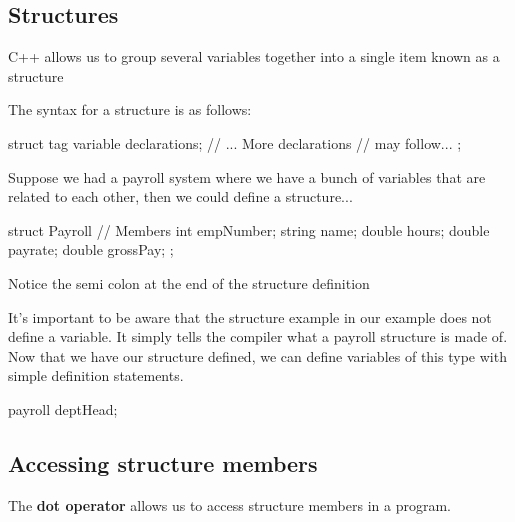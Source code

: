 \documentclass{report}
\begin{document}
	\bigbreak \noindent 
	\subsection{Structures}
	\bigbreak \noindent 
	\begin{concept}
	    C++ allows us to group several variables together into a single item known as a structure
	\end{concept}
	\bigbreak \noindent 
	The syntax for a structure is as follows:
	\bigbreak \noindent 
	
	\begin{cppcode}
struct tag {
    variable declarations;
    // ... More declarations 
    //     may follow...
};
	\end{cppcode}
	
	\bigbreak \noindent 
	Suppose we had a payroll system where we have a bunch of variables that are related to each other, then we could define a structure...
	\bigbreak \noindent 
	
	\begin{cppcode}
struct Payroll {
    // Members
    int empNumber;
    string name;
    double hours;
    double payrate;
    double grossPay;
};
	\end{cppcode}
	
	\bigbreak \noindent 
	\begin{notebox}
			Notice the semi colon at the end of the structure definition
		\end{notebox}

    \bigbreak \noindent 
	It's important to be aware that the structure example in our example does not define a variable. It simply tells the compiler what a payroll structure is made of.
	\bigbreak \noindent 
	Now that we have our structure defined, we can define variables of this type with simple definition statements.
	\bigbreak \noindent 
	
	\begin{cppcode}
payroll deptHead;
	\end{cppcode}
	

	\bigbreak \noindent 
	\subsection{Accessing structure members}
	\bigbreak \noindent 
	\begin{concept}
	    The \textbf{dot operator} allows us to access structure members in a program.
	\end{concept}
	\bigbreak \noindent 
	
\end{document}
